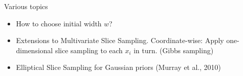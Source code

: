 







\begin{frame}{Various topics}
	\begin{itemize}
		\item How to choose initial width $w$?
		\item Extensions to Multivariate Slice Sampling. Coordinate-wise: Apply one-dimensional slice sampling to
each $x_i$ in turn. (Gibbs sampling)
		\item Elliptical Slice Sampling for Gaussian priors (Murray et al., 2010)
	\end{itemize}
\end{frame}

% 
